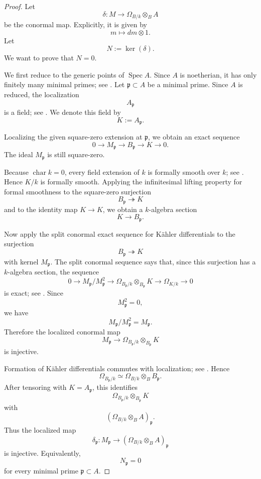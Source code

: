 \documentclass[11pt,twoside]{amsart}
\theoremstyle{plain}
\numberwithin{equation}{section}
\theoremstyle{definition}
\begin{document}
\begin{proof}
Let
\[
    \delta:M\longrightarrow \Omega_{B/k}\otimes_B A
\]
be the conormal map. Explicitly, it is given by
\[
    m\longmapsto dm\otimes 1.
\]
Let
\[
    N:=\ker(\delta).
\]
We want to prove that \(N=0\).

We first reduce to the generic points of \(\operatorname{Spec}A\). Since \(A\) is noetherian,
it has only finitely many minimal primes; see \cite[Algebra, Lemma 10.31.6]{stacks-project}.
Let \(\mathfrak p\subset A\) be a minimal prime. Since \(A\) is reduced, the localization
\[
    A_{\mathfrak p}
\]
is a field; see \cite[Algebra, Lemma 10.25.1]{stacks-project}. We denote this field by
\[
    K:=A_{\mathfrak p}.
\]

Localizing the given square-zero extension at \(\mathfrak p\), we obtain an exact sequence
\[
    0\longrightarrow M_{\mathfrak p}
    \longrightarrow B_{\mathfrak p}
    \longrightarrow K
    \longrightarrow 0.
\]
The ideal \(M_{\mathfrak p}\) is still square-zero.

Because \(\operatorname{char}k=0\), every field extension of \(k\) is formally smooth over
\(k\); see \cite[Algebra, Lemma 10.158.8]{stacks-project}. Hence \(K/k\) is formally
smooth. Applying the infinitesimal lifting property for formal smoothness to the square-zero
surjection
\[
    B_{\mathfrak p}\twoheadrightarrow K
\]
and to the identity map \(K\to K\), we obtain a \(k\)-algebra section
\[
    K\longrightarrow B_{\mathfrak p}.
\]

Now apply the split conormal exact sequence for Kähler differentials to the surjection
\[
    B_{\mathfrak p}\twoheadrightarrow K
\]
with kernel \(M_{\mathfrak p}\). The split conormal sequence says that, since this surjection
has a \(k\)-algebra section, the sequence
\[
    0
    \longrightarrow
    M_{\mathfrak p}/M_{\mathfrak p}^{2}
    \longrightarrow
    \Omega_{B_{\mathfrak p}/k}\otimes_{B_{\mathfrak p}} K
    \longrightarrow
    \Omega_{K/k}
    \longrightarrow 0
\]
is exact; see \cite[Algebra, Lemma 10.131.10]{stacks-project}. Since
\[
    M_{\mathfrak p}^{2}=0,
\]
we have
\[
    M_{\mathfrak p}/M_{\mathfrak p}^{2}=M_{\mathfrak p}.
\]
Therefore the localized conormal map
\[
    M_{\mathfrak p}
    \longrightarrow
    \Omega_{B_{\mathfrak p}/k}\otimes_{B_{\mathfrak p}} K
\]
is injective.

Formation of Kähler differentials commutes with localization; see
\cite[Algebra, Lemma 10.131.8]{stacks-project}. Hence
\[
    \Omega_{B_{\mathfrak p}/k}
    \simeq
    \Omega_{B/k}\otimes_B B_{\mathfrak p}.
\]
After tensoring with \(K=A_{\mathfrak p}\), this identifies
\[
    \Omega_{B_{\mathfrak p}/k}\otimes_{B_{\mathfrak p}} K
\]
with
\[
    \left(\Omega_{B/k}\otimes_B A\right)_{\mathfrak p}.
\]
Thus the localized map
\[
    \delta_{\mathfrak p}:M_{\mathfrak p}
    \longrightarrow
    \left(\Omega_{B/k}\otimes_B A\right)_{\mathfrak p}
\]
is injective. Equivalently,
\[
    N_{\mathfrak p}=0
\]
for every minimal prime \(\mathfrak p\subset A\).


\end{proof}
\end{document}
